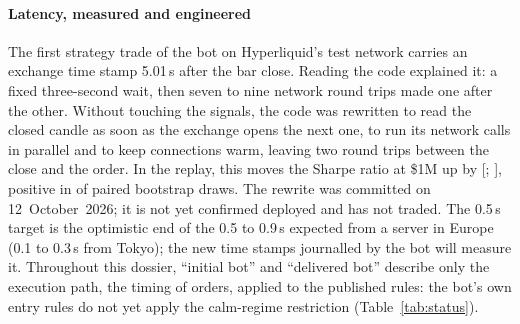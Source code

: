 \documentclass[11pt,a4paper]{article}
\begin{document}
\paragraph{Latency, measured and engineered} The first strategy trade of the bot on Hyperliquid's test network carries an exchange
time stamp 5.01\,s after the bar close. Reading the code explained it: a fixed three-second wait, then seven to nine network
round trips made one after the other. Without touching the signals, the code was rewritten to read the closed candle as soon
as the exchange opens the next one, to run its network calls in parallel and to keep connections warm, leaving two round trips
between the close and the order. In the replay, this moves the Sharpe ratio at \$1M up by \GainDelivered{}
[\GainDeliveredLo; \GainDeliveredHi], positive in \GainDeliveredShare{} of paired bootstrap draws. The rewrite was committed on
12~October~2026; it is not yet confirmed deployed and has not traded. The 0.5\,s target is the optimistic end of the 0.5 to
0.9\,s expected from a server in Europe (0.1 to 0.3\,s from Tokyo); the new time stamps journalled by the bot will measure it.
Throughout this dossier, ``initial bot'' and ``delivered bot'' describe only the execution path, the timing of orders, applied to
the published rules: the bot's own entry rules do not yet apply the calm-regime restriction (Table~\ref{tab:status}).
\end{document}

